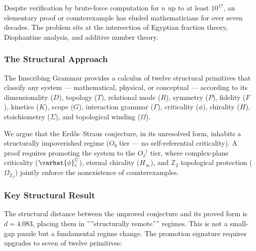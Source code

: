 \documentclass[12pt,a4paper]{article}
\begin{document}
Despite verification by brute-force computation for $n$ up to at least $10^{17}$, an elementary proof or counterexample has eluded mathematicians for over seven decades. The problem sits at the intersection of Egyptian fraction theory, Diophantine analysis, and additive number theory.

\subsubsection{The Structural Approach}

The Imscribing Grammar provides a calculus of twelve structural primitives that classify any system --- mathematical, physical, or conceptual --- according to its dimensionality ($D$), topology ($T$), relational mode ($R$), symmetry ($P$), fidelity ($F$), kinetics ($K$), scope ($G$), interaction grammar ($\Gamma$), criticality ($\phi$), chirality ($H$), stoichiometry ($\Sigma$), and topological winding ($\Omega$).

We argue that the Erdős--Straus conjecture, in its unresolved form, inhabits a structurally impoverished regime ($O₀$ tier --- no self-referential criticality). A proof requires promoting the system to the $O₂^\dagger$ tier, where complex-plane criticality ($\varhat{\phi}^{\mathbb{C}}_\text{c}$), eternal chirality ($H_{\infty}$), and $\mathbb{Z}_2$ topological protection ($\Omega_{\mathbb{Z}_2}$) jointly enforce the nonexistence of counterexamples.

\subsubsection{Key Structural Result}

The structural distance between the unproved conjecture and its proved form is $d = 4.083$, placing them in ''''structurally remote'''' regimes. This is not a small-gap puzzle but a fundamental regime change. The promotion signature requires upgrades to seven of twelve primitives:
\end{document}
